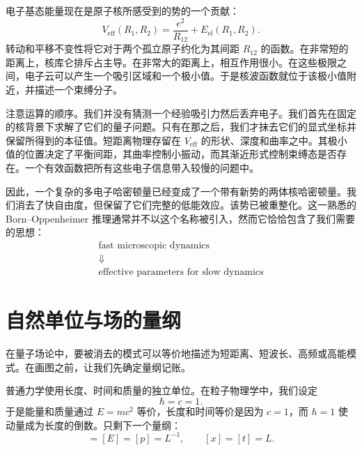 \begin{classroomqa}
\end{classroomqa}

电子基态能量现在是原子核所感受到的势的一个贡献：
\begin{equation}
V_{\mathrm{eff}}(R_1,R_2)
=\frac{e^2}{R_{12}}+E_{\mathrm{el}}(R_1,R_2).
\label{eq:molecular-effective-potential}
\end{equation}
转动和平移不变性将它对于两个孤立原子约化为其间距 \(R_{12}\) 的函数。在非常短的距离上，核库仑排斥占主导。在非常大的距离上，相互作用很小。在这些极限之间，电子云可以产生一个吸引区域和一个极小值。于是核波函数就位于该极小值附近，并描述一个束缚分子。

注意运算的顺序。我们并没有猜测一个经验吸引力然后丢弃电子。我们首先在固定的核背景下求解了它们的量子问题。只有在那之后，我们才抹去它们的显式坐标并保留所得到的本征值。短距离物理存留在 \(V_{\mathrm{eff}}\) 的形状、深度和曲率之中。其极小值的位置决定了平衡间距，其曲率控制小振动，而其渐近形式控制束缚态是否存在。一个有效函数把所有这些电子信息带入较慢的问题中。

因此，一个复杂的多电子哈密顿量已经变成了一个带有新势的两体核哈密顿量。我们消去了快自由度，但保留了它们完整的低能效应。该势已被重整化。这一熟悉的 Born--Oppenheimer 推理通常并不以这个名称被引入，然而它恰恰包含了我们需要的思想：
\begin{equation}
\begin{gathered}
\text{fast microscopic dynamics}\\
\Downarrow\\
\text{effective parameters for slow dynamics}
\end{gathered}
\end{equation}

\section{自然单位与场的量纲}

在量子场论中，要被消去的模式可以等价地描述为短距离、短波长、高频或高能模式。在画图之前，让我们先确定量纲记账。

普通力学使用长度、时间和质量的独立单位。在粒子物理学中，我们设定
\begin{equation}
\hbar=c=1.
\end{equation}
于是能量和质量通过 \(E=mc^2\) 等价，长度和时间等价是因为 \(c=1\)，而 \(\hbar=1\) 使动量成为长度的倒数。只剩下一个量纲：
\begin{equation}
[M]=[E]=[p]=L^{-1},
\qquad
[x]=[t]=L.
\label{eq:natural-units}
\end{equation}

